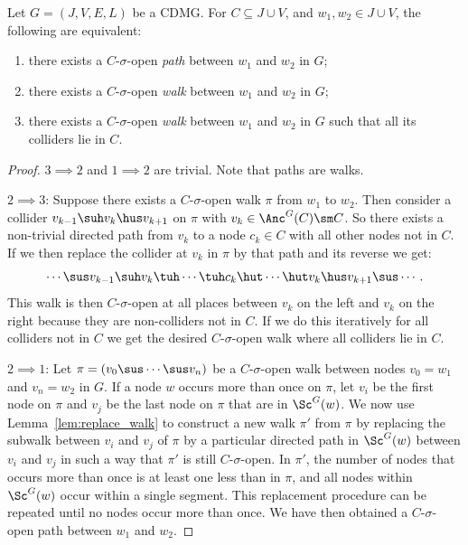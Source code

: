 \begin{Prp}\label{prp:sigma_opens-2}
  Let $G=(J,V,E,L)$ be a CDMG. For $C \subseteq J \cup V$, and $w_1, w_2 \in J \cup V$, the following are
  equivalent:
  \begin{enumerate}
      \item there exists a $C$-$\sigma$-open \emph{path} between $w_1$ and $w_2$ in $G$;
      \item there exists a $C$-$\sigma$-open \emph{walk} between $w_1$ and $w_2$ in $G$;
      \item there exists a $C$-$\sigma$-open \emph{walk} between $w_1$ and $w_2$ in $G$ such that all its colliders lie in $C$.
  \end{enumerate}

\begin{proof}
$3 \implies 2$ and $1 \implies 2$ are trivial. Note that paths are walks.

$2 \implies 3$: Suppose there exists a $C$-$\sigma$-open walk $\pi$ from $w_1$ to $w_2$.
Then consider a collider $v_{k-1} \suh v_k \hus v_{k+1}$ on $\pi$ with $v_k \in \Anc^G(C) \sm C$.
So there exists a non-trivial directed path from $v_k$ to a node $c_k \in C$ with all other nodes not in $C$.
If we then replace the collider at $v_k$ in $\pi$ by that path and its reverse we get:
\[ \cdots \sus v_{k-1} \suh v_k \tuh \cdots \tuh c_k \hut \cdots \hut v_k \hus v_{k+1} \sus \cdots.  \]
This walk is then $C$-$\sigma$-open at all places between $v_k$ on the left and $v_k$ on the right because they are non-colliders not in $C$. If we do this iteratively for all colliders not in $C$ we get the desired $C$-$\sigma$-open walk where all colliders lie in $C$.

$2 \implies 1$:
Let $\pi = (v_0 \sus \cdots \sus v_n)$ be a $C$-$\sigma$-open walk between nodes $v_0=w_1$ and $v_n=w_2$ in $G$. 
If a node $w$ occurs more than once on $\pi$, let $v_i$ be the first node on $\pi$ and $v_j$ be the last node on $\pi$ that are in $\Sc^G(w)$.
We now use Lemma~\ref{lem:replace_walk} to construct a new walk $\pi'$ from $\pi$ by replacing the subwalk between $v_i$ and $v_j$ of $\pi$ by a particular directed path in $\Sc^G(w)$ between $v_i$ and $v_j$ in such a way that $\pi'$ is still $C$-$\sigma$-open.
In $\pi'$, the number of nodes that occurs more than once is at least one less than in $\pi$, and all nodes within $\Sc^G(w)$ occur within a single segment.
This replacement procedure can be repeated until no nodes occur more than once. We have then obtained a
$C$-$\sigma$-open path between $w_1$ and $w_2$.
\end{proof}
\end{Prp}




